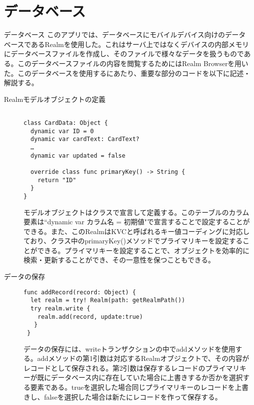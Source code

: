 \section{データベース}
データベース
このアプリでは、データベースにモバイルデバイス向けのデータベースであるRealmを使用した。これはサーバ上ではなくデバイスの内部メモリにデータベースファイルを作成し、そのファイルで様々なデータを扱うものである。このデータベースファイルの内容を閲覧するためにはRealm Browserを用いた。このデータベースを使用するにあたり、重要な部分のコードを以下に記述・解説する。
 
\begin{description}
\item[Realmモデルオブジェクトの定義]\mbox{} 
\begin{lstlisting}[basicstyle=\ttfamily\footnotesize, frame=single]
 
class CardData: Object {   
  dynamic var ID = 0
  dynamic var cardText: CardText?
  …
  dynamic var updated = false

  override class func primaryKey() -> String {
    return "ID"
  }
}
 \end{lstlisting}
 
モデルオブジェクトはクラスで宣言して定義する。このテーブルのカラム要素は``dynamic var カラム名 = 初期値"で宣言することで設定することができる。また、このRealmはKVCと呼ばれるキー値コーディングに対応しており、クラス中のprimaryKey()メソッドでプライマリキーを設定することができる。プライマリキーを設定することで、オブジェクトを効率的に検索・更新することができ、その一意性を保つこともできる。
\end{description}
 
\begin{description}
\item[データの保存]\mbox{} 
\begin{lstlisting}[basicstyle=\ttfamily\footnotesize, frame=single]
func addRecord(record: Object) {
  let realm = try! Realm(path: getRealmPath())
  try realm.write {
    realm.add(record, update:true)
   }
 }
\end{lstlisting}
 
データの保存には、writeトランザクションの中でaddメソッドを使用する。addメソッドの第1引数は対応するRealmオブジェクトで、その内容がレコードとして保存される。第2引数は保存するレコードのプライマリキーが既にデータベース内に存在していた場合に上書きするか否かを選択する要素である。trueを選択した場合同じプライマリキーのレコードを上書きし、falseを選択した場合は新たにレコードを作って保存する。
\end{description}
 
